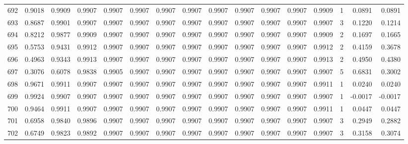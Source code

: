 \begin{tabular}{lrrrrrrrrrrrrrrr}
692 &      0.9018 &  0.9909 &  0.9907 &  0.9907 &  0.9907 &  0.9907 &  0.9907 &  0.9907 &  0.9907 &  0.9907 &   0.9907 &     0.9909 &      1 &                    0.0891 &                     0.0891 \\
693 &      0.8687 &  0.9901 &  0.9907 &  0.9907 &  0.9907 &  0.9907 &  0.9907 &  0.9907 &  0.9907 &  0.9907 &   0.9907 &     0.9907 &      3 &                    0.1220 &                     0.1214 \\
694 &      0.8212 &  0.9877 &  0.9909 &  0.9907 &  0.9907 &  0.9907 &  0.9907 &  0.9907 &  0.9907 &  0.9907 &   0.9907 &     0.9909 &      2 &                    0.1697 &                     0.1665 \\
695 &      0.5753 &  0.9431 &  0.9912 &  0.9907 &  0.9907 &  0.9907 &  0.9907 &  0.9907 &  0.9907 &  0.9907 &   0.9907 &     0.9912 &      2 &                    0.4159 &                     0.3678 \\
696 &      0.4963 &  0.9343 &  0.9913 &  0.9907 &  0.9907 &  0.9907 &  0.9907 &  0.9907 &  0.9907 &  0.9907 &   0.9907 &     0.9913 &      2 &                    0.4950 &                     0.4380 \\
697 &      0.3076 &  0.6078 &  0.9838 &  0.9905 &  0.9907 &  0.9907 &  0.9907 &  0.9907 &  0.9907 &  0.9907 &   0.9907 &     0.9907 &      5 &                    0.6831 &                     0.3002 \\
698 &      0.9671 &  0.9911 &  0.9907 &  0.9907 &  0.9907 &  0.9907 &  0.9907 &  0.9907 &  0.9907 &  0.9907 &   0.9907 &     0.9911 &      1 &                    0.0240 &                     0.0240 \\
699 &      0.9924 &  0.9907 &  0.9907 &  0.9907 &  0.9907 &  0.9907 &  0.9907 &  0.9907 &  0.9907 &  0.9907 &   0.9907 &     0.9907 &      1 &                   -0.0017 &                    -0.0017 \\
700 &      0.9464 &  0.9911 &  0.9907 &  0.9907 &  0.9907 &  0.9907 &  0.9907 &  0.9907 &  0.9907 &  0.9907 &   0.9907 &     0.9911 &      1 &                    0.0447 &                     0.0447 \\
701 &      0.6958 &  0.9840 &  0.9896 &  0.9907 &  0.9907 &  0.9907 &  0.9907 &  0.9907 &  0.9907 &  0.9907 &   0.9907 &     0.9907 &      3 &                    0.2949 &                     0.2882 \\
702 &      0.6749 &  0.9823 &  0.9892 &  0.9907 &  0.9907 &  0.9907 &  0.9907 &  0.9907 &  0.9907 &  0.9907 &   0.9907 &     0.9907 &      3 &                    0.3158 &                     0.3074 \\

\end{tabular}
